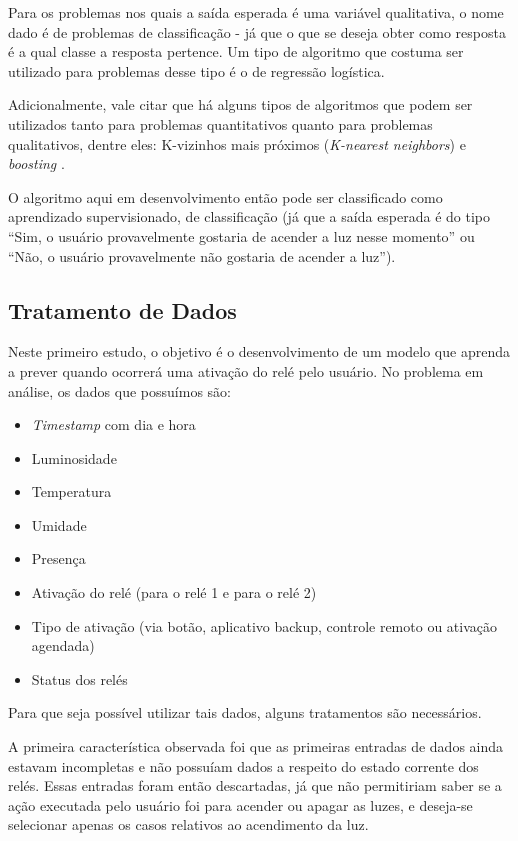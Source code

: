 			Para os problemas nos quais a saída esperada é uma variável qualitativa, o nome dado é de problemas de classificação - já que o que se deseja obter como resposta é a qual classe a resposta pertence. Um tipo de algoritmo que costuma ser utilizado para problemas desse tipo é o de regressão logística.

			Adicionalmente, vale citar que há alguns tipos de algoritmos que podem ser utilizados tanto para problemas quantitativos quanto para problemas qualitativos, dentre eles: K-vizinhos mais próximos (\emph{K-nearest neighbors}) e \emph{boosting} \cite{islr}.

			O algoritmo aqui em desenvolvimento então pode ser classificado como aprendizado supervisionado, de classificação (já que a saída esperada é do tipo ``Sim, o usuário provavelmente gostaria de acender a luz nesse momento'' ou ``Não, o usuário provavelmente não gostaria de acender a luz'').

		\subsection{Tratamento de Dados}
			
			Neste primeiro estudo, o objetivo é o desenvolvimento de um modelo que aprenda a prever quando ocorrerá uma ativação do relé pelo usuário. No problema em análise, os dados que possuímos são:

			\begin{itemize}
				\item \emph{Timestamp} com dia e hora
				\item Luminosidade
				\item Temperatura
				\item Umidade
				\item Presença
				\item Ativação do relé (para o relé 1 e para o relé 2)
				\item Tipo de ativação (via botão, aplicativo backup, controle remoto ou ativação agendada)
				\item Status dos relés
			\end{itemize}

			Para que seja possível utilizar tais dados, alguns tratamentos são necessários.

			A primeira característica observada foi que as primeiras entradas de dados ainda estavam incompletas e não possuíam dados a respeito do estado corrente dos relés. Essas entradas foram então descartadas, já que não permitiriam saber se a ação executada pelo usuário foi para acender ou apagar as luzes, e deseja-se selecionar apenas os casos relativos ao acendimento da luz.

